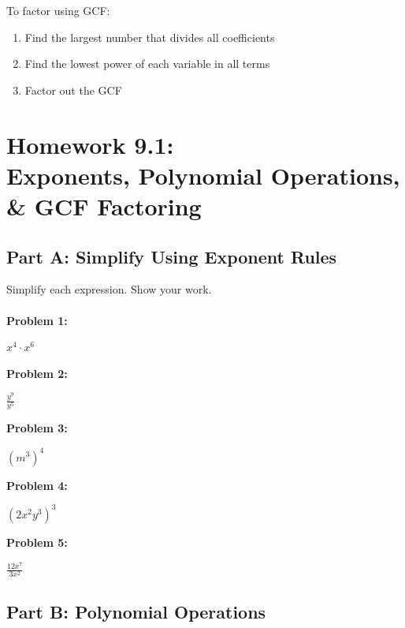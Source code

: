 \documentclass[12pt]{article}
\begin{document}
			To factor using GCF:
			\begin{enumerate}
				\item Find the largest number that divides all coefficients
				\item Find the lowest power of each variable in all terms
				\item Factor out the GCF
			\end{enumerate}

			\newpage

	\section*{Homework 9.1: \\ Exponents, Polynomial Operations, \& GCF Factoring}

		\subsection*{Part A: Simplify Using Exponent Rules}

			Simplify each expression. Show your work.\\\\

			\textbf{Problem 1:}
            
            $x^4 \cdot x^6$

			\vspace{2cm}

			\textbf{Problem 2:}
            
            $\frac{y^9}{y^5}$

			\vspace{2cm}

			\textbf{Problem 3:}
            
            $(m^3)^4$

			\vspace{2cm}

			\textbf{Problem 4:}
            
            $(2x^2y^3)^3$

			\vspace{2cm}

			\textbf{Problem 5:}
            
            $\frac{12x^7}{3x^2}$

			\newpage

		\subsection*{Part B: Polynomial Operations}
\end{document}
